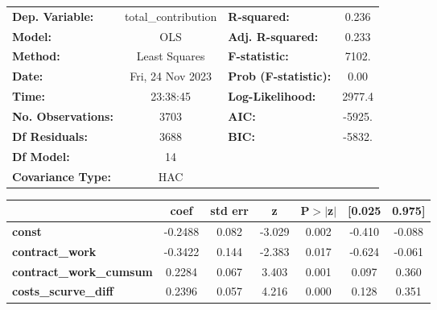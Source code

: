 \begin{center}
\begin{tabular}{lclc}
\toprule
\textbf{Dep. Variable:}                     & total\_contribution & \textbf{  R-squared:         } &     0.236   \\
\textbf{Model:}                             &         OLS         & \textbf{  Adj. R-squared:    } &     0.233   \\
\textbf{Method:}                            &    Least Squares    & \textbf{  F-statistic:       } &     7102.   \\
\textbf{Date:}                              &   Fri, 24 Nov 2023  & \textbf{  Prob (F-statistic):} &     0.00    \\
\textbf{Time:}                              &       23:38:45      & \textbf{  Log-Likelihood:    } &    2977.4   \\
\textbf{No. Observations:}                  &          3703       & \textbf{  AIC:               } &    -5925.   \\
\textbf{Df Residuals:}                      &          3688       & \textbf{  BIC:               } &    -5832.   \\
\textbf{Df Model:}                          &            14       & \textbf{                     } &             \\
\textbf{Covariance Type:}                   &         HAC         & \textbf{                     } &             \\
\bottomrule
\end{tabular}
\begin{tabular}{lcccccc}
                                            & \textbf{coef} & \textbf{std err} & \textbf{z} & \textbf{P$> |$z$|$} & \textbf{[0.025} & \textbf{0.975]}  \\
\midrule
\textbf{const}                              &      -0.2488  &        0.082     &    -3.029  &         0.002        &       -0.410    &       -0.088     \\
\textbf{contract\_work}                     &      -0.3422  &        0.144     &    -2.383  &         0.017        &       -0.624    &       -0.061     \\
\textbf{contract\_work\_cumsum}             &       0.2284  &        0.067     &     3.403  &         0.001        &        0.097    &        0.360     \\
\textbf{costs\_scurve\_diff}                &       0.2396  &        0.057     &     4.216  &         0.000        &        0.128    &        0.351     \\

\end{tabular}
\end{center}
